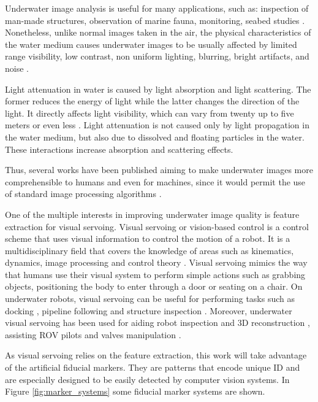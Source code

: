 \documentclass[conference, letterpaper]{IEEEtran}
\begin{document}
Underwater image analysis is useful for many applications, such as:
inspection of man-made structures, observation of marine fauna, monitoring,
seabed studies \cite{Aulinas2011}. Nonetheless, unlike normal images taken in
the air, the physical characteristics of the water medium causes underwater
images to be usually affected by limited range visibility, low contrast, non
uniform lighting, blurring, bright artifacts, and noise \cite{Yang2012}.

Light attenuation in water is caused by light absorption and light
scattering. The former reduces the energy of light while the latter changes the
direction of the light. It directly affects light visibility, which can vary
from twenty up to five meters or even less \cite{Schettini2010}. Light
attenuation is not caused only by light propagation in the water medium, but
also due to dissolved and floating particles in the water. These
interactions increase absorption and scattering effects.

Thus, several works have been published aiming to make underwater images more
comprehensible to humans and even for machines, since it would permit the use
of standard image processing algorithms \cite{Schettini2010} \cite{sankpal2016nonuniform} \cite{rodrigues2016enhancement} \cite{bazeille2006automatic}
\cite{arnold2005preprocessing} \cite{chiang2012underwater} \cite{iqbal2007underwater}.

One of the multiple interests in improving underwater image quality is
feature extraction for visual servoing. Visual servoing or vision-based
control is a control scheme that uses visual information to control the motion
of a robot. It is a multidisciplinary field that covers the knowledge of areas
such as kinematics, dynamics, image processing and control theory
\cite{Hutchinson1996}. Visual servoing mimics the way that humans use their
visual system to perform simple actions such as grabbing objects, positioning
the body to enter through a door or seating on a chair. On underwater robots,
visual servoing can be useful for performing tasks such as docking
\cite{Lee2003}, pipeline following \cite{Rives1997} and structure inspection
\cite{KRUPINSKI2015274}. Moreover, underwater visual servoing has been used
for aiding robot inspection and 3D reconstruction \cite{4302315}, assisting
ROV pilots \cite{4099090} and valves manipulation \cite{1282820}.

As visual servoing relies on the feature extraction, this work will take
advantage of the artificial fiducial markers. They are patterns that encode
unique ID and are especially designed to be easily detected by computer vision
systems. In Figure \ref{fig:marker_systems} some fiducial marker systems are
shown.
\end{document}
